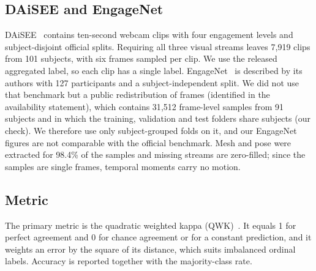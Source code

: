 \subsection{DAiSEE and EngageNet}
DAiSEE~\cite{gupta2016daisee} contains ten-second webcam clips with four engagement levels and subject-disjoint official splits. Requiring all three visual streams leaves 7{,}919 clips from 101 subjects, with six frames sampled per clip. We use the released aggregated label, so each clip has a single label. EngageNet~\cite{singh2023engagenet} is described by its authors with 127 participants and a subject-independent split. We did not use that benchmark but a public redistribution of frames (identified in the availability statement), which contains 31{,}512 frame-level samples from 91 subjects and in which the training, validation and test folders share subjects (our check). We therefore use only subject-grouped folds on it, and our EngageNet figures are not comparable with the official benchmark. Mesh and pose were extracted for 98.4\% of the samples and missing streams are zero-filled; since the samples are single frames, temporal moments carry no motion.

\subsection{Metric}
The primary metric is the quadratic weighted kappa (QWK)~\cite{cohen1968weighted}. It equals 1 for perfect agreement and 0 for chance agreement or for a constant prediction, and it weights an error by the square of its distance, which suits imbalanced ordinal labels. Accuracy is reported together with the majority-class rate.
